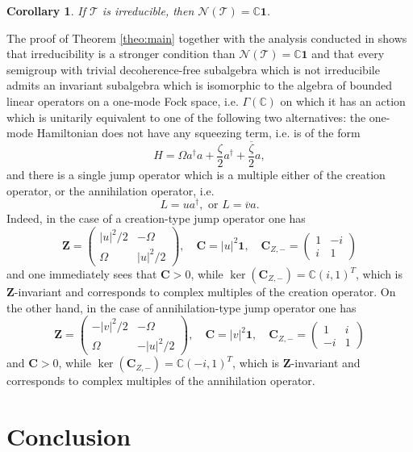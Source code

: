 \documentclass[preprint]{elsarticle}
\newtheorem{coro}[defi]{Corollary}
\theoremstyle{definition}
\def\CC{\mathbb{C}}
\def\TT{\mathcal{T}}
\def\NN{\mathcal{N}(\TT)}
\begin{document}
\begin{coro} \label{coro:irrimplnt}
    If $\TT$ is irreducible, then $\NN=\CC\mathbf{1}$.
\end{coro}

The proof of Theorem \ref{theo:main} together with the analysis conducted in \cite{AFP21} shows that irreducibility is a stronger condition than $\NN=\CC\mathbf{1}$ and that every semigroup with trivial decoherence-free subalgebra which is not irreducibile admits an invariant subalgebra which is isomorphic to the algebra of bounded linear operators on a one-mode Fock space, i.e. $\Gamma(\CC)$ on which it has an action which is unitarily equivalent to one of the following two alternatives: the one-mode Hamiltonian does not have any squeezing term, i.e. is of the form
$$H=\Omega a^\dagger a +\frac{\zeta}{2}a^\dagger+\frac{\overline{\zeta}}{2}a,$$
and there is a single jump operator which is a multiple either of the creation operator, or the annihilation operator, i.e.
$$L=u a^\dagger, \text{ or }L=\overline{v} a.$$
Indeed, in the case of a creation-type jump operator one has
$$\mathbf{Z}=\begin{pmatrix} |u|^2/2 & -\Omega\\
\Omega & |u|^2/2\end{pmatrix}, \quad \mathbf{C}=|u|^2\mathbf{1}, \quad   \mathbf{C}_{Z,-} =\begin{pmatrix} 1 & -i \\
i & 1\end{pmatrix}$$
and one immediately sees that $\mathbf{C}>0$, while $\ker(\mathbf{C}_{Z,-})=\CC (i,1)^T$, which is $\mathbf{Z}$-invariant and corresponds to complex multiples of the creation operator. On the other hand, in the case of annihilation-type jump operator one has
$$\mathbf{Z}=\begin{pmatrix} -|v|^2/2 & -\Omega\\
\Omega & -|u|^2/2\end{pmatrix}, \quad \mathbf{C}=|v|^2\mathbf{1}, \quad   \mathbf{C}_{Z,-} =\begin{pmatrix} 1 & i \\
-i & 1\end{pmatrix}$$
and $\mathbf{C}>0$, while $\ker(\mathbf{C}_{Z,-})=\CC (-i,1)^T$, which is $\mathbf{Z}$-invariant and corresponds to complex multiples of the annihilation operator. 

\section{Conclusion}
\end{document}
